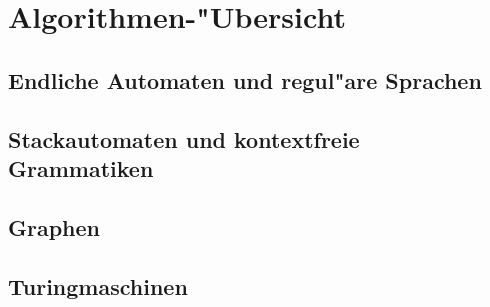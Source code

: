 \chapter{Algorithmen-"Ubersicht\label{skript:algorithmen}}
\rhead{}
\section{Endliche Automaten und regul"are Sprachen}
\section{Stackautomaten und kontextfreie Grammatiken}
\section{Graphen}
\section{Turingmaschinen}

